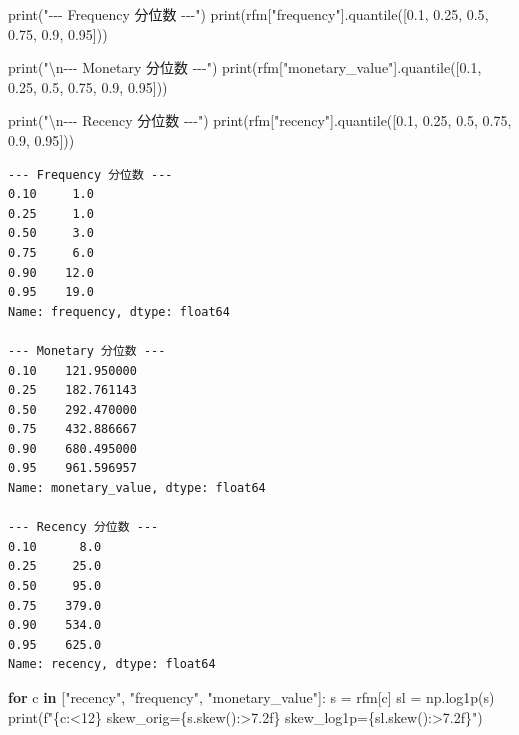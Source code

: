 \documentclass[
]{ctexart}
\newenvironment{Shaded}{\begin{snugshade}}{\end{snugshade}}
\newcommand{\BuiltInTok}[1]{\textcolor[rgb]{0.00,0.23,0.31}{#1}}
\newcommand{\CharTok}[1]{\textcolor[rgb]{0.13,0.47,0.30}{#1}}
\newcommand{\ControlFlowTok}[1]{\textcolor[rgb]{0.00,0.23,0.31}{\textbf{#1}}}
\newcommand{\FloatTok}[1]{\textcolor[rgb]{0.68,0.00,0.00}{#1}}
\newcommand{\KeywordTok}[1]{\textcolor[rgb]{0.00,0.23,0.31}{\textbf{#1}}}
\newcommand{\NormalTok}[1]{\textcolor[rgb]{0.00,0.23,0.31}{#1}}
\newcommand{\OperatorTok}[1]{\textcolor[rgb]{0.37,0.37,0.37}{#1}}
\newcommand{\SpecialCharTok}[1]{\textcolor[rgb]{0.37,0.37,0.37}{#1}}
\newcommand{\SpecialStringTok}[1]{\textcolor[rgb]{0.13,0.47,0.30}{#1}}
\newcommand{\StringTok}[1]{\textcolor[rgb]{0.13,0.47,0.30}{#1}}
\begin{document}
\begin{Shaded}
\begin{Highlighting}[]
\BuiltInTok{print}\NormalTok{(}\StringTok{"{-}{-}{-} Frequency 分位数 {-}{-}{-}"}\NormalTok{)}
\BuiltInTok{print}\NormalTok{(rfm[}\StringTok{"frequency"}\NormalTok{].quantile([}\FloatTok{0.1}\NormalTok{, }\FloatTok{0.25}\NormalTok{, }\FloatTok{0.5}\NormalTok{, }\FloatTok{0.75}\NormalTok{, }\FloatTok{0.9}\NormalTok{, }\FloatTok{0.95}\NormalTok{]))}

\BuiltInTok{print}\NormalTok{(}\StringTok{"}\CharTok{\textbackslash{}n}\StringTok{{-}{-}{-} Monetary 分位数 {-}{-}{-}"}\NormalTok{)}
\BuiltInTok{print}\NormalTok{(rfm[}\StringTok{"monetary\_value"}\NormalTok{].quantile([}\FloatTok{0.1}\NormalTok{, }\FloatTok{0.25}\NormalTok{, }\FloatTok{0.5}\NormalTok{, }\FloatTok{0.75}\NormalTok{, }\FloatTok{0.9}\NormalTok{, }\FloatTok{0.95}\NormalTok{]))}

\BuiltInTok{print}\NormalTok{(}\StringTok{"}\CharTok{\textbackslash{}n}\StringTok{{-}{-}{-} Recency 分位数 {-}{-}{-}"}\NormalTok{)}
\BuiltInTok{print}\NormalTok{(rfm[}\StringTok{"recency"}\NormalTok{].quantile([}\FloatTok{0.1}\NormalTok{, }\FloatTok{0.25}\NormalTok{, }\FloatTok{0.5}\NormalTok{, }\FloatTok{0.75}\NormalTok{, }\FloatTok{0.9}\NormalTok{, }\FloatTok{0.95}\NormalTok{]))}
\end{Highlighting}
\end{Shaded}

\begin{verbatim}
--- Frequency 分位数 ---
0.10     1.0
0.25     1.0
0.50     3.0
0.75     6.0
0.90    12.0
0.95    19.0
Name: frequency, dtype: float64

--- Monetary 分位数 ---
0.10    121.950000
0.25    182.761143
0.50    292.470000
0.75    432.886667
0.90    680.495000
0.95    961.596957
Name: monetary_value, dtype: float64

--- Recency 分位数 ---
0.10      8.0
0.25     25.0
0.50     95.0
0.75    379.0
0.90    534.0
0.95    625.0
Name: recency, dtype: float64
\end{verbatim}

\begin{Shaded}
\begin{Highlighting}[]
\ControlFlowTok{for}\NormalTok{ c }\KeywordTok{in}\NormalTok{ [}\StringTok{"recency"}\NormalTok{, }\StringTok{"frequency"}\NormalTok{, }\StringTok{"monetary\_value"}\NormalTok{]:}
\NormalTok{    s }\OperatorTok{=}\NormalTok{ rfm[c]}
\NormalTok{    sl }\OperatorTok{=}\NormalTok{ np.log1p(s)}
    \BuiltInTok{print}\NormalTok{(}\SpecialStringTok{f"}\SpecialCharTok{\{}\NormalTok{c}\SpecialCharTok{:\textless{}12\}}\SpecialStringTok{ skew\_orig=}\SpecialCharTok{\{}\NormalTok{s}\SpecialCharTok{.}\NormalTok{skew()}\SpecialCharTok{:\textgreater{}7.2f\}}\SpecialStringTok{  skew\_log1p=}\SpecialCharTok{\{}\NormalTok{sl}\SpecialCharTok{.}\NormalTok{skew()}\SpecialCharTok{:\textgreater{}7.2f\}}\SpecialStringTok{"}\NormalTok{)}
\end{Highlighting}
\end{Shaded}
\end{document}

